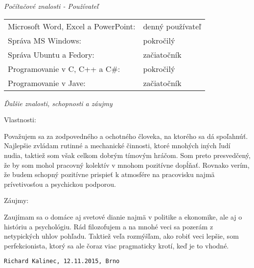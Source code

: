 \documentclass{article}
\begin{document}
\bigskip

\begin{flushleft}
\Large
\textit{\textsf{Počítačové znalosti - Používateľ}}
\normalsize
\end{flushleft}

\smallskip

\begin{adjustwidth}{-6pt}{}
	\begin{tabular}{l l}
		Microsoft Word, Excel a PowerPoint: & denný používateľ \\
		Správa MS Windows: & pokročilý \\
		Správa Ubuntu a Fedory: & začiatočník \\
		Programovanie v C, C++ a C\#: & pokročilý \\
		Programovanie v Jave: & začiatočník
	\end{tabular}
\end{adjustwidth}

\bigskip

\begin{flushleft}
\Large
\textit{\textsf{Ďalšie znalosti, schopnosti a záujmy}}
\normalsize
\end{flushleft}

\smallskip

\begin{flushleft}
\large
Vlastnosti:
\end{flushleft}

Považujem sa za zodpovedného a ochotného človeka, na ktorého sa dá spoľahnúť. Najlepšie zvládam rutinné a mechanické činnosti, ktoré mnohých iných ľudí nudia, taktiež som však celkom dobrým tímovým hráčom. Som preto presvedčený, že by som mohol pracovný kolektív v mnohom pozitívne dopĺňať. Rovnako verím, že budem schopný pozitívne prispieť k atmosfére na pracovisku najmä prívetivosťou a psychickou podporou.

\smallskip

\begin{flushleft}
\large
Záujmy:
\end{flushleft}

Zaujímam sa o domáce aj svetové dianie najmä v politike a ekonomike,
ale aj o históriu a psychológiu. Rád filozofujem a na mnohé veci sa
pozerám z netypických uhlov pohľadu. Taktiež veľa rozmýšľam, ako robiť veci lepšie, som perfekcionista, ktorý sa ale čoraz viac pragmaticky krotí, keď je to vhodné.

\bigskip

\texttt{Richard Kalinec, 12.11.2015, Brno}
\end{document}
